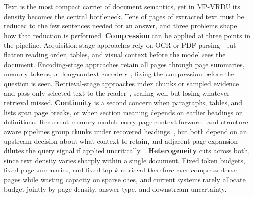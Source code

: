 \documentclass[11pt]{article}
\begin{document}
Text is the most compact carrier of document semantics, yet in MP-VRDU its density becomes the central bottleneck. Tens of pages of extracted text must be reduced to the few sentences needed for an answer, and three problems shape how that reduction is performed. \textbf{Compression} can be applied at three points in the pipeline. Acquisition-stage approaches rely on OCR or PDF parsing~\cite{wang2024docllm} but flatten reading order, tables, and visual context before the model sees the document. Encoding-stage approaches retain all pages through page summaries, memory tokens, or long-context encoders~\cite{borchmann2025arctic}, fixing the compression before the question is seen. Retrieval-stage approaches index chunks or sampled evidence and pass only selected text to the reader~\cite{xie2024wukong}, scaling well but losing whatever retrieval missed. \textbf{Continuity} is a second concern when paragraphs, tables, and lists span page breaks, or when section meaning depends on earlier headings or definitions. Recurrent memory models carry page context forward~\cite{dong2024multi} and structure-aware pipelines group chunks under recovered headings~\cite{shin2025multidocfusion}, but both depend on an upstream decision about what context to retain, and adjacent-page expansion dilutes the query signal if applied uncritically~\cite{qian2026accurate}. \textbf{Heterogeneity} cuts across both, since text density varies sharply within a single document. Fixed token budgets, fixed page summaries, and fixed top-$k$ retrieval therefore over-compress dense pages while wasting capacity on sparse ones, and current systems rarely allocate budget jointly by page density, answer type, and downstream uncertainty.
\end{document}
